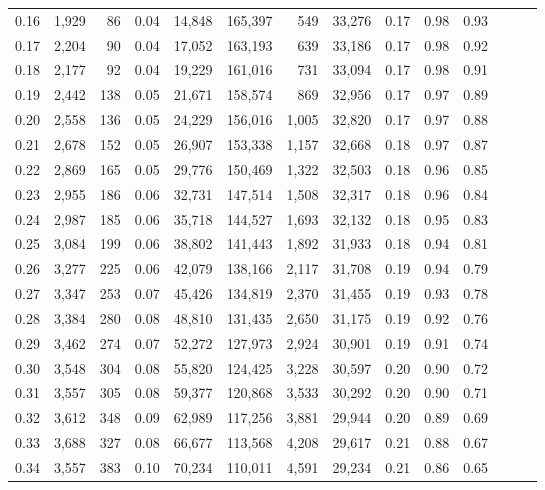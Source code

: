 \begin{tabular}{rrrrrrrrrrrrrr}
0.16 &  1,929 &   86 &  0.04 &   14,848 &  165,397 &     549 &  33,276 &  0.17 &  0.98 &      0.93 \\
0.17 &  2,204 &   90 &  0.04 &   17,052 &  163,193 &     639 &  33,186 &  0.17 &  0.98 &      0.92 \\
0.18 &  2,177 &   92 &  0.04 &   19,229 &  161,016 &     731 &  33,094 &  0.17 &  0.98 &      0.91 \\
0.19 &  2,442 &  138 &  0.05 &   21,671 &  158,574 &     869 &  32,956 &  0.17 &  0.97 &      0.89 \\
0.20 &  2,558 &  136 &  0.05 &   24,229 &  156,016 &   1,005 &  32,820 &  0.17 &  0.97 &      0.88 \\
0.21 &  2,678 &  152 &  0.05 &   26,907 &  153,338 &   1,157 &  32,668 &  0.18 &  0.97 &      0.87 \\
0.22 &  2,869 &  165 &  0.05 &   29,776 &  150,469 &   1,322 &  32,503 &  0.18 &  0.96 &      0.85 \\
0.23 &  2,955 &  186 &  0.06 &   32,731 &  147,514 &   1,508 &  32,317 &  0.18 &  0.96 &      0.84 \\
0.24 &  2,987 &  185 &  0.06 &   35,718 &  144,527 &   1,693 &  32,132 &  0.18 &  0.95 &      0.83 \\
0.25 &  3,084 &  199 &  0.06 &   38,802 &  141,443 &   1,892 &  31,933 &  0.18 &  0.94 &      0.81 \\
0.26 &  3,277 &  225 &  0.06 &   42,079 &  138,166 &   2,117 &  31,708 &  0.19 &  0.94 &      0.79 \\
0.27 &  3,347 &  253 &  0.07 &   45,426 &  134,819 &   2,370 &  31,455 &  0.19 &  0.93 &      0.78 \\
0.28 &  3,384 &  280 &  0.08 &   48,810 &  131,435 &   2,650 &  31,175 &  0.19 &  0.92 &      0.76 \\
0.29 &  3,462 &  274 &  0.07 &   52,272 &  127,973 &   2,924 &  30,901 &  0.19 &  0.91 &      0.74 \\
0.30 &  3,548 &  304 &  0.08 &   55,820 &  124,425 &   3,228 &  30,597 &  0.20 &  0.90 &      0.72 \\
0.31 &  3,557 &  305 &  0.08 &   59,377 &  120,868 &   3,533 &  30,292 &  0.20 &  0.90 &      0.71 \\
0.32 &  3,612 &  348 &  0.09 &   62,989 &  117,256 &   3,881 &  29,944 &  0.20 &  0.89 &      0.69 \\
0.33 &  3,688 &  327 &  0.08 &   66,677 &  113,568 &   4,208 &  29,617 &  0.21 &  0.88 &      0.67 \\
0.34 &  3,557 &  383 &  0.10 &   70,234 &  110,011 &   4,591 &  29,234 &  0.21 &  0.86 &      0.65 \\

\end{tabular}
